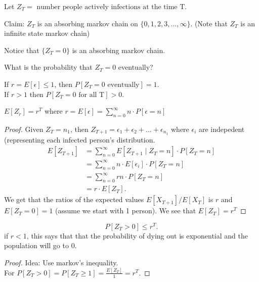 \documentclass[a4paper]{article}
\begin{document}
Let $Z_T = \text{ number people actively infections at the time T}$.

\begin{note}
Claim: $Z_T$ is an absorbing markov chain on  $\{0,1,2,3,\ldots, \infty\} $. (Note that $Z_T$ is an infinite state markov chain)
\end{note}
Notice that $\{Z_T =0 \} $ is an absorbing markov chain.  

\begin{note}
  What is the probability that $Z_T =0 $ eventually?
\end{note}
If $r = E[\epsilon] \leq1$, then $P[Z_T = 0 \text{ eventually}] = 1$. \\
If $r > 1$ then $P[Z_T = 0 \text{ for all T}] > 0$. 

\begin{lemma}
  $E[Z_r]=r^{T}$ where $r = E[\epsilon] = \sum_{n=0}^{\infty} n \cdot P[\epsilon = n]$
\end{lemma}

\begin{proof}
  Given $Z_T = n_{1}$, then $Z_{T + 1} = \epsilon_{1} + \epsilon_2 + \ldots + \epsilon_{n_1}$ where $\epsilon_i$ are indepedent (representing each infected person's distribution. 
  \begin{align*}
    E[Z_{T+1}] &= \sum_{n=0}^{\infty} E[Z_{T+1} \mid Z_T = n]  \cdot P[Z_T = n] \\
               &=  \sum_{n=0}^{\infty} n \cdot E[\epsilon_i] \cdot P[Z_T = n]  \\
               &= \sum_{n=0}^{\infty} rn \cdot P[Z_{T} = n]  \\
               &= r \cdot E[Z_T] 
  .\end{align*}
  We get that the ratios of the expected values $E[X_{T+1}] / E[X_T]$ is $r$  and $E[Z_T = 0] = 1$ (assume we start with 1 person). We see that $E[Z_T] =r^{T}$ 
\end{proof}

\begin{corollary}
  \[
    P[Z_T > 0 ] \leq r^{T}
  .\] 
  if $r <1$, this says that that the probability of dying out is exponential and the population will go to 0. 
\end{corollary}

\begin{proof}
  Idea: Use markov's inequality. \\
  For $P[Z_T > 0] = P[Z_T \geq 1] = \frac{E[Z_T]}{1} = r^{T}$.
\end{proof}
\end{document}
